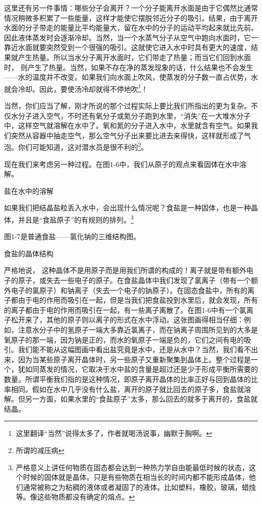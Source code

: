 \documentclass[12pt,oneside]{book}
\begin{document}
这里还有另一件事情：哪些分子会离开？一个分子能离开水面是由于它偶然比通常情况稍微多积累了一些能量，这样才能使它摆脱邻近分子的吸引。结果，由于离开水面的分子带走的能量比平均能量大，留在水中的分子的运动平均起来就比先前。因此液体蒸发时会逐渐冷却。当然，当一个水蒸气分子从空气中跑向水面时，它一靠近水面就要突然受到一个很强的吸引。这就使它进入水中时具有更大的速度，结果就产生热量。所以当水分子离开水面时，它们带走了热量；而当它们回到水面时， 则产生了热量。当然，如果不存在净的蒸发现象的话，什么结果也不会发生——水的温度并不改变。如果我们向水面上吹风，使蒸发的分子数一直占优势，水就会冷却。因此，要使汤冷却就得不停地吹\footnote{这里翻译“当然”说得太多了，作者就喝汤说事，幽默于胸啊。}！

当然，你们应当了解，刚才所说的那个过程实际上要比我们所指出的更为复杂。不仅水分子进入空气，不时还有氧分子或氮分子跑到水里，“消失”在一大堆水分子中，这样空气就溶解在水中了。氧和氮的分子进入水中，水里就含有空气。如果我们突然从容器中抽走空气，那么空气分子出来要比进去来得快，这样就形成了气泡。你们可能知道，这对潜水员是很不利的\footnote{所谓的减压病}。

现在我们来考虑另一种过程。在图1-6中，我们从原子的观点来看固体在水中溶解。
\begin{fig}{盐在水中的溶解}
\caption{盐在水中的溶解}
\label{fig:盐在水中的溶解}
\end{fig}
如果我们把结晶盐粒丢入水中，会出现什么情况呢？食盐是一种固体，也是一种晶体，并且是“食盐原子”的有规则的排列。\footnote{严格意义上讲任何物质在固态都会达到一种热力学自由能最低时候的状态，这个时候的固体就是晶体。只是有些物质在相当长的时间内都不能形成晶体，他们通常被称之为粘稠的液体或者凝固了的液体。比如塑料，橡胶，玻璃，蜡烛等。像这些物质都没有确定的熔点。}

图1-7是普通食盐——氯化钠的三维结构图。
\begin{fig}{食盐的晶体结构}
\caption{食盐的晶体结构}
\label{fig:食盐的晶体结构}
\end{fig}
严格地说， 这种晶体不是用原子而是用我们所谓的构成的！离子就是带有额外电子的原子，或失去一些电子的原子。在食盐晶体中我们发现了氯离子（带有一个额外电子的氯原子）和钠离子（失去一个电子的钠原子）。在固态食盐中，所有的离子都由于电的作用而吸引在一起，但是当我们把食盐投到水里后，就会发现，所有的离子都由于电的作用而吸引在一起，有一些离子离散了。在图1-6中有一个氯离子松开来了，其他的原子则以离子的形式在水中浮动。这张图画得相当仔细：例如，注意水分子中的氢原子一端大多靠近氯离子，而在钠离子周围所见到的大多是氧原子的那一端，因为钠是正的，而水的氧原子一端是负的，它们之间有电的吸引。我们能不能从这幅图画中看出盐究竟是水中，还是从水中？当然，我们看不出来，因为当某些原子离开晶体时，另一些原子又重新聚集到晶体上。整个过程是一个，犹如同蒸发的情况，它取决于水中盐的含量是超过还是少于形成平衡所需要的数量。所谓平衡我们指的是这种情况，即原子离开晶体的比率正好与回到晶体的比率相同。假如在水中几乎没有什么盐，离开的原子就比回去的原子多，食盐就溶解。但另一方面，如果水里的“食盐原子”太多，那么回去的就多于离开的，食盐就结晶。
\end{document}
